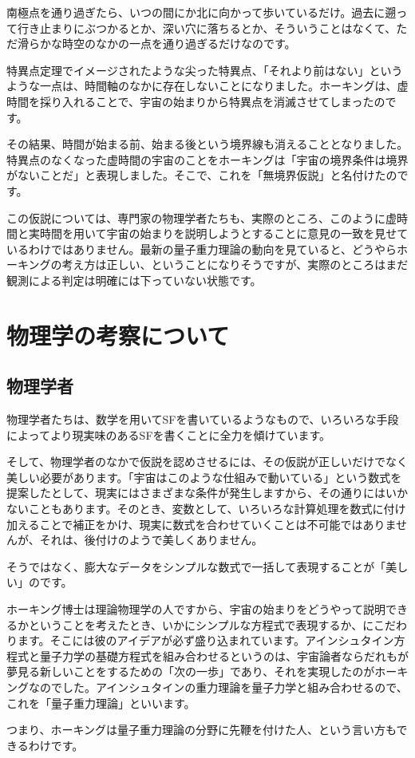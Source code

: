 \documentclass[10pt,b5paper,papersize,dvipdfmx]{jsbook}
\begin{document}
南極点を通り過ぎたら、いつの間にか北に向かって歩いているだけ。過去に遡って行き止まりにぶつかるとか、深い穴に落ちるとか、そういうことはなくて、ただ滑らかな時空のなかの一点を通り過ぎるだけなのです。\par
特異点定理でイメージされたような尖った特異点、「それより前はない」というような一点は、時間軸のなかに存在しないことになりました。ホーキングは、虚時間を採り入れることで、宇宙の始まりから特異点を消滅させてしまったのです。\par
その結果、時間が始まる前、始まる後という境界線も消えることとなりました。特異点のなくなった虚時間の宇宙のことをホーキングは「宇宙の境界条件は境界がないことだ」と表現しました。そこで、これを「無境界仮説」と名付けたのです。\par
この仮説については、専門家の物理学者たちも、実際のところ、このように虚時間と実時間を用いて宇宙の始まりを説明しようとすることに意見の一致を見せているわけではありません。最新の量子重力理論の動向を見ていると、どうやらホーキングの考え方は正しい、ということになりそうですが、実際のところはまだ観測による判定は明確には下っていない状態です。

\section{物理学の考察について}


\subsection{物理学者}
物理学者たちは、数学を用いてSFを書いているようなもので、いろいろな手段によってより現実味のあるSFを書くことに全力を傾けています。\par
そして、物理学者のなかで仮説を認めさせるには、その仮説が正しいだけでなく美しい必要があります。「宇宙はこのような仕組みで動いている」という数式を提案したとして、現実にはさまざまな条件が発生しますから、その通りにはいかないこともあります。そのとき、変数として、いろいろな計算処理を数式に付け加えることで補正をかけ、現実に数式を合わせていくことは不可能ではありませんが、それは、後付けのようで美しくありません。\par
そうではなく、膨大なデータをシンプルな数式で一括して表現することが「美しい」のです。\par
ホーキング博士は理論物理学の人ですから、宇宙の始まりをどうやって説明できるかということを考えたとき、いかにシンプルな方程式で表現するか、にこだわります。そこには彼のアイデアが必ず盛り込まれています。アインシュタイン方程式と量子力学の基礎方程式を組み合わせるというのは、宇宙論者ならだれもが夢見る新しいことをするための「次の一歩」であり、それを実現したのがホーキングなのでした。アインシュタインの重力理論を量子力学と組み合わせるので、これを「量子重力理論」といいます。\par
つまり、ホーキングは量子重力理論の分野に先鞭を付けた人、という言い方もできるわけです。\par
\end{document}
